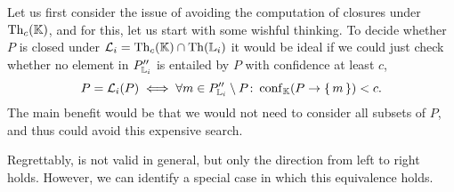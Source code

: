 Let us first consider the issue of avoiding the computation of closures under
$\operatorname{Th}_{c}({\mathbb{K}})$, and for this, let us start with some wishful thinking.  To decide
whether $P$ is closed under $\mathcal{L}_{i} = \operatorname{Th}_{c}({\mathbb{K}}) \cap \operatorname{Th}({\mathbb{L}}_{i})$ it
would be ideal if we could just check whether no element in $P_{{\mathbb{L}}_{i}}''$ is entailed
by $P$ with confidence at least $c$, \ie
\begin{equation}
  \label{eq:43}
  P = \mathcal{L}_{i}(P) \iff \forall m \in P_{{\mathbb{L}}_{i}}'' \setminus P \colon
  \operatorname{conf}_{{\mathbb{K}}}(P \to {\ensuremath{\{\,m\,\}}}) < c.
\end{equation}
The main benefit would be that we would not need to consider all subsets of $P$, and thus
could avoid this expensive search.

Regrettably,  is not valid in general, but only the direction from left to
right holds.  However, we can identify a special case in which this equivalence holds.

